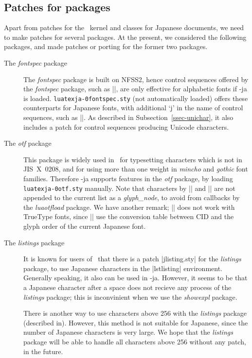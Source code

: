 \documentclass{ajt}
\begin{document}
\subsection{Patches for packages}
Apart from patches for the \LaTeXe~kernel and classes for Japanese
documents, we need to make patches for several packages. At the present,
we considered the following packages, and made patches or porting for
the former two packages.

\begin{description}
\item[The \emph{fontspec} package] The \emph{fontspec} package is built
	   on NFSS2, hence control sequences offered by the
	   \emph{fontspec} package, such as |\setmainfont|, are only
	   effective for alphabetic fonts if \LuaTeX-ja is loaded.
	   \texttt{luatexja-\penalty0fontspec.sty} (not automatically
	   loaded) offers these counterparts for Japanese fonts, with
	   additional `j' in the name of control sequences, such as
	   |\setmainjfont|. As described in
	   Subsection~\ref{ssec-unichar}, it also includes a patch for
	   control sequences producing Unicode characters.

\item[The \emph{otf} package]
This package is widely used in \pTeX\ for typesetting characters which is
not in JIS~X~0208, and for using more than one weight in \emph{mincho}
and \emph{gothic} font families. Therefore \LuaTeX-ja supports features
in the \emph{otf} package, by loading \texttt{luatexja-\penalty0otf.sty}
	   manually. Note that characters by || and
	   || are not appended to the current list as a
	   \emph{glyph\_node}, to avoid from callbacks by the
	   \emph{luaotfload} package. We have another remark; |\CID|
	   does not work with TrueType fonts, since |\CID| use the
	   conversion table between CID and the glyph order of the
	   current Japanese font.

\item[The \emph{listings} package]
It is known for users of \pTeX\ that there is a patch |jlisting.sty| for
	   the \emph{listings} package, to use Japanese characters in
	   the |lstlisting| environment. Generally speaking, it also can
	   be used in \LuaTeX-ja. However, it seems to be that a
	   Japanese character after a space does not recieve any process
	   of the \emph{listings} package; this is inconvinient when we
	   use the \emph{showexpl} package.

There is another way to use characters above 256 with the
	   \emph{listings} package (described in\cite{apl}). However,
	   this method is not suitable for Japanese, since the number of
	   Japanese characters is very large. We hope that the
	   \emph{listings} package will be able to handle all characters above
	   256 without any patch, in the future.


\end{description}
\end{document}
